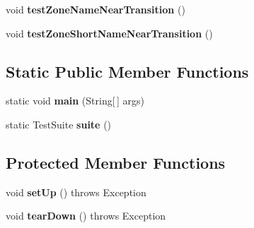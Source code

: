 \begin{DoxyCompactItemize}
\item 
\hypertarget{classorg_1_1joda_1_1time_1_1format_1_1_test_date_time_formatter_a897004fc2ca073d4eade5d127e1e96d6}{void {\bfseries test\-Zone\-Name\-Near\-Transition} ()}\label{classorg_1_1joda_1_1time_1_1format_1_1_test_date_time_formatter_a897004fc2ca073d4eade5d127e1e96d6}

\item 
\hypertarget{classorg_1_1joda_1_1time_1_1format_1_1_test_date_time_formatter_ad8ab64c18c0ee7d21654af43c0a378bb}{void {\bfseries test\-Zone\-Short\-Name\-Near\-Transition} ()}\label{classorg_1_1joda_1_1time_1_1format_1_1_test_date_time_formatter_ad8ab64c18c0ee7d21654af43c0a378bb}

\end{DoxyCompactItemize}
\subsection*{Static Public Member Functions}
\begin{DoxyCompactItemize}
\item 
\hypertarget{classorg_1_1joda_1_1time_1_1format_1_1_test_date_time_formatter_ac88c4209530b396ab7bc408530068b84}{static void {\bfseries main} (String\mbox{[}$\,$\mbox{]} args)}\label{classorg_1_1joda_1_1time_1_1format_1_1_test_date_time_formatter_ac88c4209530b396ab7bc408530068b84}

\item 
\hypertarget{classorg_1_1joda_1_1time_1_1format_1_1_test_date_time_formatter_a1b422ba6ef1742a87e834a5b98380770}{static Test\-Suite {\bfseries suite} ()}\label{classorg_1_1joda_1_1time_1_1format_1_1_test_date_time_formatter_a1b422ba6ef1742a87e834a5b98380770}

\end{DoxyCompactItemize}
\subsection*{Protected Member Functions}
\begin{DoxyCompactItemize}
\item 
\hypertarget{classorg_1_1joda_1_1time_1_1format_1_1_test_date_time_formatter_af487f0508ef9e7565aad22085fc45cab}{void {\bfseries set\-Up} ()  throws Exception }\label{classorg_1_1joda_1_1time_1_1format_1_1_test_date_time_formatter_af487f0508ef9e7565aad22085fc45cab}

\item 
\hypertarget{classorg_1_1joda_1_1time_1_1format_1_1_test_date_time_formatter_a3b1cba12a435b8fdf26ab313a25284d4}{void {\bfseries tear\-Down} ()  throws Exception }\label{classorg_1_1joda_1_1time_1_1format_1_1_test_date_time_formatter_a3b1cba12a435b8fdf26ab313a25284d4}

\end{DoxyCompactItemize}


